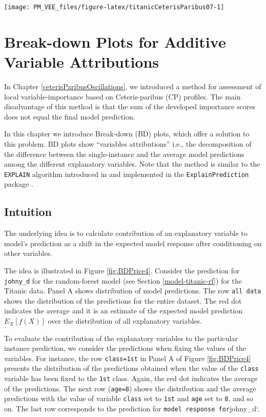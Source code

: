 \documentclass[12pt,]{krantz}
\begin{document}
\begin{center}\texttt{[image: PM\_VEE\_files/figure-latex/titanicCeterisParibus07-1]} \end{center}

\hypertarget{breakDown}{%
\section{Break-down Plots for Additive Variable Attributions}\label{breakDown}}

In Chapter \ref{ceterisParibusOscillations}, we introduced a method for assessment of local variable-importance based on Ceteris-paribus (CP) profiles. The main disadvantage of this method is that the sum of the developed importance scores does not equal the final model prediction.

In this chapter we introduce Break-down (BD) plots, which offer a solution to this problem.
BD plots show ``variables attributions'' i.e., the decomposition of the difference between the single-instance and the average model predictions among the different explanatory variables.
Note that the method is similar to the \texttt{EXPLAIN} algorithm introduced in \citep{explainPaper} and implemented in the \texttt{ExplainPrediction} package \citep{explainPackage}.

\hypertarget{BDIntuition}{%
\subsection{Intuition}\label{BDIntuition}}

The underlying idea is to calculate contribution of an explanatory variable to model's prediction as a shift in the expected model response after conditioning on other variables.

The idea is illustrated in Figure \ref{fig:BDPrice4}. Consider the prediction for \texttt{johny\_d} for the random-forest model (see Section \ref{model-titanic-rf}) for the Titanic data. Panel A shows distribution of model predictions. The row \texttt{all\ data} shows the distribution of the predictions for the entire dataset. The red dot indicates the average and it is an estimate of the expected model prediction \(E_X[f(X)]\) over the distribution of all explanatory variables.

To evaluate the contribution of the explanatory variables to the particular instance prediction, we consider the predictions when fixing the values of the variables. For instance, the row \texttt{class=1st} in Panel A of Figure \ref{fig:BDPrice4} presents the distribution of the predictions obtained when the value of the \texttt{class} variable has been fixed to the \texttt{1st} class. Again, the red dot indicates the average of the predictions. The next row (\texttt{age=8}) shows the distribution and the average predictions with the value of variable \texttt{class} set to \texttt{1st} and \texttt{age} set to \texttt{8}, and so on. The last row corresponds to the prediction for \texttt{model\ response\ for}johny\_d`.
\end{document}
